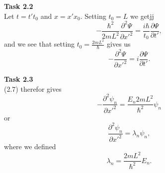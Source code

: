 \documentclass{article}
\newcommand{\del}[2]{\frac{\partial #1}{\partial #2}}  %
\newcommand{\ddel}[2]{\frac{\partial^2 #1}{\partial #2^2}}  %
\begin{document}
\noindent\textbf{Task 2.2}\\
Let $t = t' t_0$ and $x=x' x_0$.
Setting $t_0 = L$ we getjj
$$
-\frac{\hbar^2}{2mL^2} \ddel{\Psi}{x'} = \frac{i\hbar}{t_0} \del{\Psi}{t'},
$$
and we see that setting $t_0 = \frac{2mL^2}{\hbar}$ gives us
$$
-\ddel{\Psi}{x'} = i \del{\Psi}{t'}.
$$


\noindent\textbf{Task 2.3}\\
(2.7) therefor gives
$$
-\ddel{\psi_n}{x'} = \frac{E_n 2mL^2}{\hbar^2} \psi_n
$$
or
$$
\ddel{\psi_n}{x'} = \lambda_n \psi_n,
$$
where we defined
$$
\lambda_n = \frac{2mL^2}{\hbar^2} E_n.
$$
\end{document}
